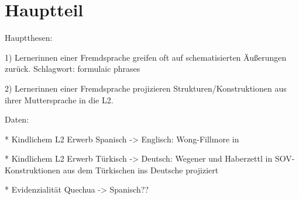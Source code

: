 \section{Hauptteil}

Hauptthesen:

1) Lernerinnen einer Fremdsprache greifen oft auf schematisierten Äußerungen zurück.
Schlagwort: formulaic phrases

2) Lernerinnen einer Fremdsprache projizieren Strukturen/Konstruktionen aus ihrer Muttersprache in die L2.

Daten:

* Kindlichem L2 Erwerb Spanisch -> Englisch: Wong-Fillmore\cite{} in \cite{Haberzettl06}

* Kindlichem L2 Erwerb Türkisch -> Deutsch: Wegener\cite{} und Haberzettl\cite{} in \cite{Haberzettl06}
SOV-Konstruktionen aus dem Türkischen ins Deutsche projiziert

* Evidenzialität Quechua -> Spanisch??
